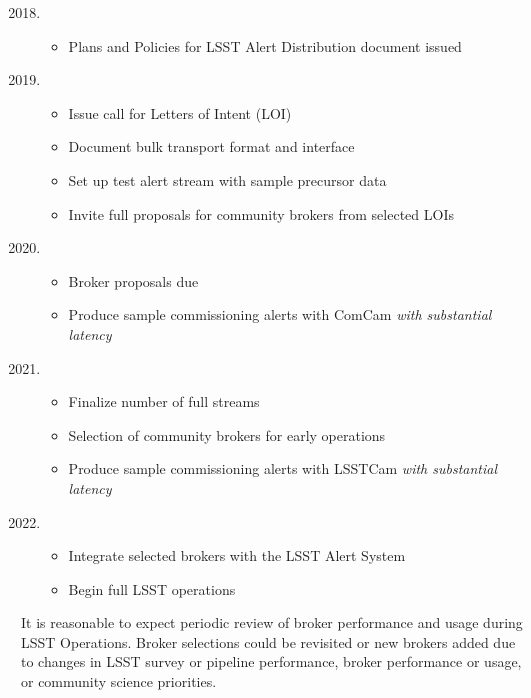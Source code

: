 {
	\renewcommand\labelenumi{\textbf{\theenumi}}
\begin{enumerate}
  \setcounter{enumi}{2017}
	\item \begin{itemize} %
		\item Plans and Policies for LSST Alert Distribution document issued
	\end{itemize}
	\item \begin{itemize}%
		\item Issue call for Letters of Intent (LOI)
		\item Document bulk transport format and interface
		\item Set up test alert stream with sample precursor data
		\item Invite full proposals for community brokers from selected LOIs
		\end{itemize}
	\item \begin{itemize} %
		\item Broker proposals due
		\item Produce sample commissioning alerts with ComCam \textit{with substantial latency}
		\end{itemize}
	\item \begin{itemize} %
			\item Finalize number of full streams
			\item Selection of community brokers for early operations
			\item Produce sample commissioning alerts with LSSTCam \textit{with substantial latency}
		\end{itemize}

	\item \begin{itemize} %
			\item Integrate selected brokers with the LSST Alert System
			\item Begin full LSST operations
	\end{itemize}

\end{enumerate}
}

It is reasonable to expect periodic review of broker performance and usage during LSST Operations.
Broker selections could be revisited or new brokers added due to changes in LSST survey or pipeline performance, broker performance or usage, or community science priorities.

